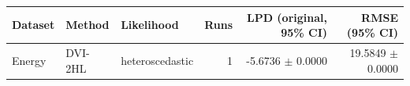 \begin{tabular}{lllrrr}
\toprule
Dataset & Method & Likelihood & Runs & LPD (original, 95\% CI) & RMSE (95\% CI) \\
\midrule
Energy & DVI-2HL & heteroscedastic & 1 & -5.6736 $\pm$ 0.0000 & 19.5849 $\pm$ 0.0000 \\
\bottomrule
\end{tabular}
